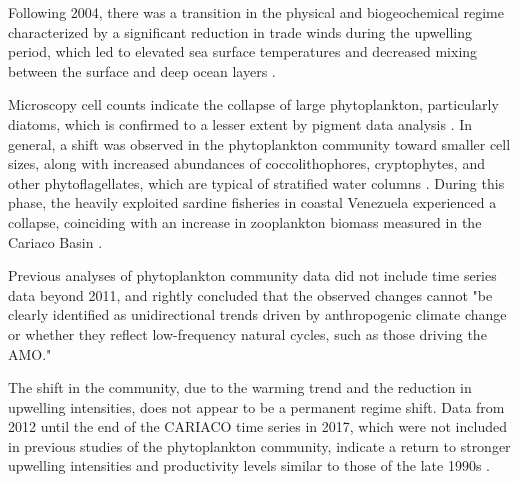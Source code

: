     Following 2004, there was a transition in the physical and biogeochemical regime characterized by a significant reduction in trade winds during the upwelling period, which led to elevated sea surface temperatures and decreased mixing between the surface and deep ocean layers \cite{taylor_ecosystem_2012}.

    Microscopy cell counts indicate the collapse of large phytoplankton, particularly diatoms, which is confirmed to a lesser extent by pigment data analysis \cite{pinckney_phytoplankton_2015}. In general, a shift was observed in the phytoplankton community toward smaller cell sizes, along with increased abundances of coccolithophores, cryptophytes, and other phytoflagellates, which are typical of stratified water columns \cite{pinckney_phytoplankton_2015}. During this phase, the heavily exploited sardine fisheries in coastal Venezuela experienced a collapse, coinciding with an increase in zooplankton biomass measured in the Cariaco Basin \cite{taylor_ecosystem_2012}.

    Previous analyses of phytoplankton community data did not include time series data beyond 2011, and  rightly concluded that the observed changes cannot "be clearly identified as unidirectional trends driven by anthropogenic climate change or whether they reflect low-frequency natural cycles, such as those driving the AMO."  
    
    
    The shift in the community, due to the warming trend and the reduction in upwelling intensities, does not appear to be a permanent regime shift. Data from 2012 until the end of the CARIACO time series in 2017, which were not included in previous studies of the phytoplankton community, indicate a return to stronger upwelling intensities and productivity levels similar to those of the late 1990s \cite{muller-karger_scientific_2019}.


